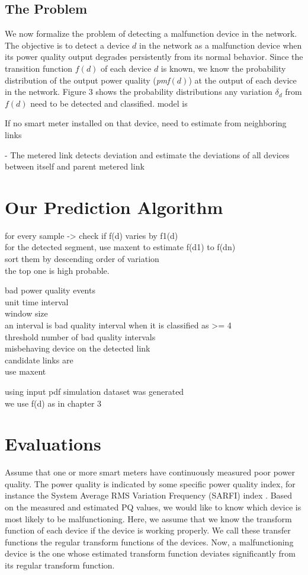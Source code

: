 \documentclass[12pt,oneside]{book}
\begin{document}
\subsection{The Problem}
We now formalize the problem of detecting a malfunction device in the network. The objective is to detect a device $d$ in the network as a malfunction device when its power quality output degrades persistently from its normal behavior. Since the transition function $f(d)$ of each device $d$ is known, we know the probability distribution of the output power quality (\emph{pmf}$\left(d\right)$) at the output of each device in the network. Figure 3 shows the probability distributions    any variation $\delta_d$ from $f(d)$ need to be detected and classified. model is     

If no smart meter installed on that device, need to estimate from neighboring links

- The metered link detects deviation and estimate the deviations of all devices between itself and parent metered link


\section{Our Prediction Algorithm}
for every sample -> check if f(d) varies by f1(d)\\
for the detected segment, use maxent to estimate f(d1) to f(dn)\\
sort them by descending order of variation\\
the top one is high probable.

bad power quality events\\
unit time interval\\
window size\\
an interval is bad quality interval when it is classified as >= 4\\
threshold number of bad quality intervals\\
misbehaving device on the detected link\\
candidate links are\\
use maxent


using input pdf simulation dataset was generated\\
we use f(d) as in chapter 3


\section{Evaluations}
Assume that one or more smart meters have continuously measured poor power quality. The power quality is indicated by some specific power quality index, for instance the System Average RMS Variation Frequency (SARFI) index . Based on the measured and estimated PQ values, we would like to know which device is most likely to be malfunctioning. Here, we assume that we know the transform function of each device if the device is working properly. We call these transfer functions the regular transform functions of the devices. Now, a malfunctioning device is the one whose estimated transform function deviates significantly from its regular transform function.
\end{document}
